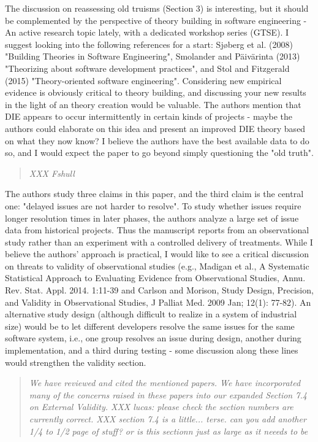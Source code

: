 The discussion on reassessing old truisms (Section 3) is
interesting, but it should be complemented by the
perspective of theory building in software engineering - An
active research topic lately, with a dedicated workshop
series (GTSE). I suggest looking into the following
references for a start: Sjøberg et al. (2008) "Building
Theories in Software Engineering", Smolander and Päivärinta
(2013) "Theorizing about software development practices",
and Stol and Fitzgerald (2015) "Theory-oriented software
engineering". Considering new empirical evidence is
obviously critical to theory building, and discussing your
new results in the light of an theory creation would be
valuable. The authors mention that DIE appears to occur
intermittently in certain kinds of projects - maybe the
authors could elaborate on this idea and present an improved
DIE theory based on what they now know? I believe the
authors have the best available data to do so, and I would
expect the paper to go beyond simply questioning the "old
truth". 
 
 \begin{quote}{\em 
XXX Fshull
}\end{quote}

The authors study three claims in this paper, and the
third claim is the central one: "delayed issues are not
harder to resolve". To study whether issues require longer
resolution times in later phases, the authors analyze a
large set of issue data from historical projects. Thus the
manuscript reports from an observational study rather than
an experiment with a controlled delivery of treatments.
While I believe the authors' approach is practical, I would
like to see a critical discussion on threats to validity of
observational studies (e.g., Madigan et al., A Systematic
Statistical Approach to Evaluating Evidence from
Observational Studies, Annu. Rev. Stat. Appl. 2014. 1:11-39
and Carlson and Morison, Study Design, Precision, and
Validity in Observational Studies, J Palliat Med. 2009 Jan;
12(1): 77-82). An alternative study design (although
difficult to realize in a system of industrial size) would
be to let different developers resolve the same issues for
the same software system, i.e., one group resolves an issue
during design, another during implementation, and a third
during testing - some discussion along these lines would
strengthen the validity section. 

\begin{quote}{\em 
 We have reviewed and cited the mentioned papers. We have incorporated many of the concerns raised in these papers into our expanded Section 7.4 on External Validity.
XXX lucas: please check the section numbers are currently
correct. XXX section 7.4 is a little... terse. can you add another 1/4 to 1/2 page of stuff? or is this sectionn just as large as it neeeds to be
}\end{quote}

